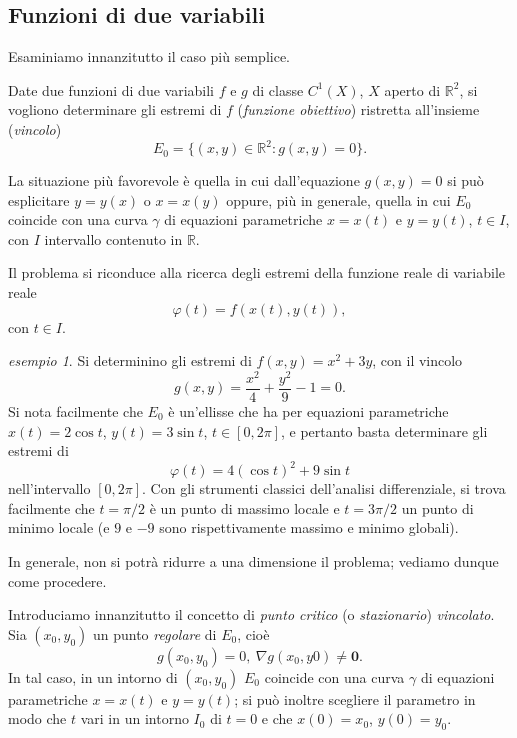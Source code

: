 \documentclass[a4paper]{book}
\numberwithin{equation}{section}
\renewcommand{\phi}{\varphi}
\theoremstyle{plain}
\theoremstyle{definition}
\theoremstyle{remark}
\renewcommand{\vec}{\boldsymbol}
\theoremstyle{example}
\newtheorem{exmp}{esempio}[section]
\begin{document}
	\subsection{Funzioni di due variabili}
	Esaminiamo innanzitutto il caso più semplice.

	Date due funzioni di due variabili $f$ e $g$ di classe $C^1(X)$, $X$ aperto di $\mathbb{R}^2$, si vogliono determinare gli estremi di $f$ (\emph{funzione obiettivo}) ristretta all'insieme (\emph{vincolo})
	\begin{equation*}
		E_0 = \{ (x, y) \in \mathbb{R}^2 \colon g(x, y) = 0 \}.
	\end{equation*}

	La situazione più favorevole è quella in cui dall'equazione $g(x, y) = 0$ si può esplicitare $y = y(x)$ o $x = x(y)$ oppure, più in generale, quella in cui $E_0$ coincide con una curva $\gamma$ di equazioni parametriche $x = x(t)$ e $y = y(t)$, $t \in I$, con $I$ intervallo contenuto in $\mathbb{R}$.

	Il problema si riconduce alla ricerca degli estremi della funzione reale di variabile reale
	\begin{equation*}
		\phi (t) = f(x(t), y(t)),
	\end{equation*}
	con $t \in I$.

	\begin{exmp}
		Si determinino gli estremi di $f(x, y) = x^2 + 3y$, con il vincolo
		\begin{equation*}
			g(x,y) = \frac{x^2}{4} + \frac{y^2}{9} - 1 = 0.
		\end{equation*}
		Si nota facilmente che $E_0$ è un'ellisse che ha per equazioni parametriche $x(t) = 2 \cos{t}$, $y(t) = 3\sin{t}$, $t \in [0, 2 \pi]$, e pertanto basta determinare gli estremi di
		\begin{equation*}
			\phi(t) = 4(\cos{t})^2 + 9\sin{t}
		\end{equation*}
		nell'intervallo $[0, 2\pi]$. Con gli strumenti classici dell'analisi differenziale, si trova facilmente che $t= \pi/2$ è un punto di massimo locale e $t = 3\pi/2$ un punto di minimo locale (e $9$ e $-9$ sono rispettivamente massimo e minimo globali).
	\end{exmp}

	In generale, non si potrà ridurre a una dimensione il problema; vediamo dunque come procedere.

	Introduciamo innanzitutto il concetto di \emph{punto critico} (o \emph{stazionario}) \emph{vincolato}. Sia $(x_0, y_0)$ un punto \emph{regolare} di $E_0$, cioè
	\begin{equation*}
		g(x_0, y_0) = 0, \ \nabla g(x_0, y0) \ne \vec{0}.
	\end{equation*}
	In tal caso, in un intorno di $(x_0, y_0)$ $E_0$ coincide con una curva $\gamma$ di equazioni parametriche $x = x(t)$ e $y = y(t)$; si può inoltre scegliere il parametro in modo che $t$ vari in un intorno $I_0$ di $t = 0$ e che $x(0) = x_0$, $y(0) = y_0$.
\end{document}
